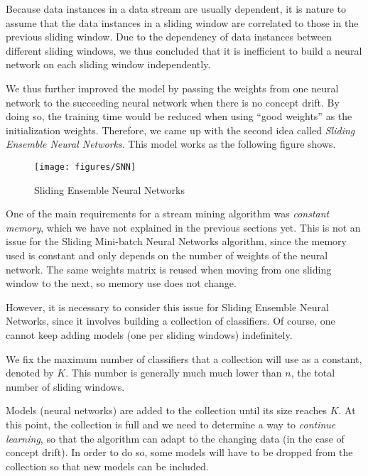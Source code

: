 \documentclass[conference]{IEEEtran}
\begin{document}
		Because data instances in a data stream are usually dependent, it is nature to assume that the data instances in a sliding window are correlated to those in the previous sliding window.  Due to the dependency of data instances between different sliding windows, we thus concluded that it is inefficient to build a neural network on each sliding window independently.   
		
		We thus further improved the model by passing the weights from one neural network to the succeeding neural network when there is no concept drift. By doing so, the training time would be reduced when using ``good weights'' as the initialization weights.  Therefore, we came up with the second idea called \emph{Sliding Ensemble Neural Networks}. This model works as the following figure shows.
		
		
		\begin{figure}[H]
			\centering
			\texttt{[image: figures/SNN]}
			\caption{Sliding Ensemble Neural Networks}
			\label{fig:SNN}
		\end{figure}
		
		One of the main requirements for a stream mining algorithm was \emph{constant memory}, which we have not explained in the previous sections yet. This is not an issue for the Sliding Mini-batch Neural Networks algorithm, since the memory used is constant and only depends on the number of weights of the neural network. The same weights matrix is reused when moving from one sliding window to the next, so memory use does not change.
		
		However, it is necessary to consider this issue for Sliding Ensemble Neural Networks, since it involves building a collection of classifiers. Of course, one cannot keep adding models (one per sliding windows) indefinitely.
		
		We fix the maximum number of classifiers that a collection will use as a constant, denoted by $K$. This number is generally much much lower than $n$, the total number of sliding windows.
		
		Models (neural networks) are added to the collection until its size reaches $K$. At this point, the collection is full and we need to determine a way to \emph{continue learning}, so that the algorithm can adapt to the changing data (in the case of concept drift). In order to do so, some models will have to be dropped from the collection so that new models can be included.
		
\end{document}
